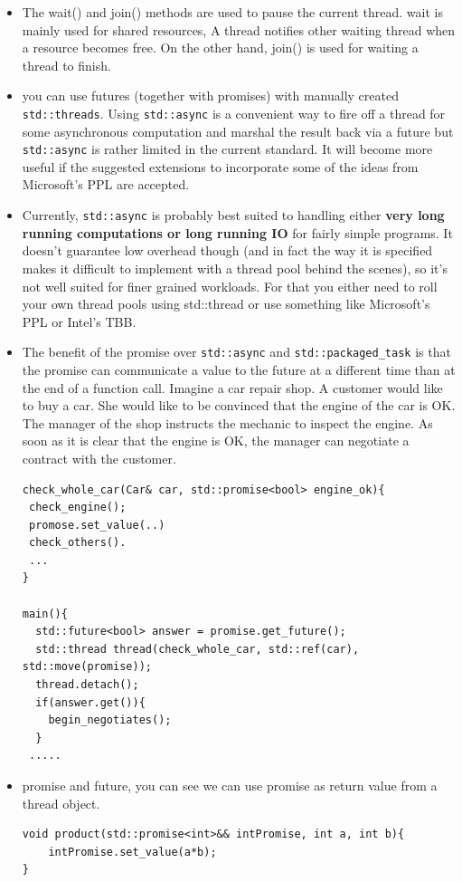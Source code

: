\documentclass[a4paper,11pt,twoside]{book}
\begin{document}
\begin{itemize}
    \item The wait() and join() methods are used to pause the current thread. wait is mainly used for shared resources, A thread notifies other waiting thread when a resource becomes free. On the other hand, join() is used for waiting a thread to finish.

    \item you can use futures (together with promises) with manually created \texttt{std::threads}. Using \texttt{std::async} is a convenient way to fire off a thread for some asynchronous computation and marshal the result back via a future but \texttt{std::async} is rather limited in the current standard. It will become more useful if the suggested extensions to incorporate some of the ideas from Microsoft's PPL are accepted.

    \item Currently, \texttt{std::async} is probably best suited to handling either \textbf{very long running computations or long running IO} for fairly simple programs. It doesn't guarantee low overhead though (and in fact the way it is specified makes it difficult to implement with a thread pool behind the scenes), so it's not well suited for finer grained workloads. For that you either need to roll your own thread pools using std::thread or use something like Microsoft's PPL or Intel's TBB. 

    \item The benefit of the promise over \texttt{std::async} and \texttt{std::packaged\_task} is that the promise can communicate a value to the future at a different time than at the end of a function call. Imagine a car repair shop. A customer would like to buy a car. She would like to be convinced that the engine of the car is OK. The manager of the shop instructs the mechanic to inspect the engine. As soon as it is clear that the engine is OK, the manager can negotiate a contract with the customer.
\begin{lstlisting}[]
check_whole_car(Car& car, std::promise<bool> engine_ok){
 check_engine();
 promose.set_value(..)
 check_others().
 ...
}

main(){
  std::future<bool> answer = promise.get_future();
  std::thread thread(check_whole_car, std::ref(car), std::move(promise));
  thread.detach();
  if(answer.get()){
    begin_negotiates();
  }
 ..... 
\end{lstlisting}

\item promise and future, you can see we can use promise as return value from a thread object.
\begin{lstlisting}[numbers=none]
void product(std::promise<int>&& intPromise, int a, int b){
	intPromise.set_value(a*b);
}


\end{lstlisting}
\end{itemize}
\end{document}
